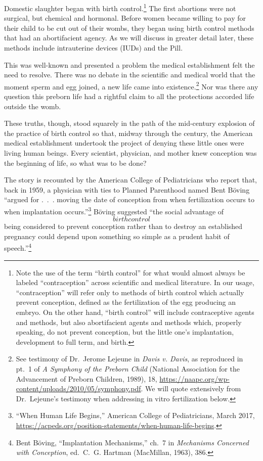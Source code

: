 \documentclass[
]{book}
\begin{document}
Domestic slaughter began with birth control.\footnote{Note the use of the term ``birth control'' for what would almost always be labeled ``contraception'' across scientific and medical literature. In our usage, ``contraception'' will refer only to methods of birth control which actually prevent conception, defined as the fertilization of the egg producing an embryo. On the other hand, ``birth control'' will include contraceptive agents and methods, but also abortifacient agents and methods which, properly speaking, do not prevent conception, but the little one's implantation, development to full term, and birth.} The first abortions were not surgical, but chemical and hormonal. Before women became willing to pay for their child to be cut out of their wombs, they began using birth control methods that had an abortifacient agency. As we will discuss in greater detail later, these methods include intrauterine devices (IUDs) and the Pill.

This was well-known and presented a problem the medical establishment felt the need to resolve. There was no debate in the scientific and medical world that the moment sperm and egg joined, a new life came into existence.\footnote{See testimony of Dr.~Jerome Lejeune in \emph{Davis v. Davis}, as reproduced in pt.~1 of \emph{A Symphony of the Preborn Child} (National Association for the Advancement of Preborn Children, 1989), 18, \url{https://naapc.org/wp-content/uploads/2010/05/symphony.pdf}. We will quote extensively from Dr.~Lejeune's testimony when addressing in vitro fertilization below.} Nor was there any question this preborn life had a rightful claim to all the protections accorded life outside the womb.

These truths, though, stood squarely in the path of the mid-century explosion of the practice of birth control so that, midway through the century, the American medical establishment undertook the project of denying these little ones were living human beings. Every scientist, physician, and mother knew conception was the beginning of life, so what was to be done?

The story is recounted by the American College of Pediatricians who report that, back in 1959, a physician with ties to Planned Parenthood named Bent Böving ``argued for .~.~. moving the date of conception from when fertilization occurs to when implantation occurs.''\footnote{``When Human Life Begins,'' American College of Pediatricians, March 2017, \url{https://acpeds.org/position-statements/when-human-life-begins}.} Böving suggested ``the social advantage of \[birth control\] being considered to prevent conception rather than to destroy an established pregnancy could depend upon something so simple as a prudent habit of speech.''\footnote{Bent Böving, ``Implantation Mechanisms,'' ch.~7 in \emph{Mechanisms Concerned with Conception}, ed.~C.~G. Hartman (MacMillan, 1963), 386.}
\end{document}
